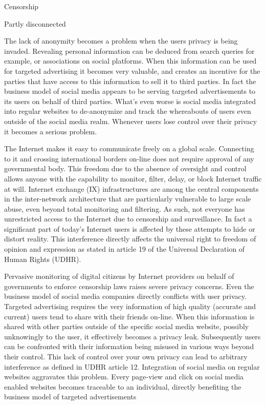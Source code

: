 
Censorship

Partly disconnected

The lack of anonymity becomes a problem when the users privacy is being invaded.
Revealing personal information can be deduced from search queries for example, or associations on social platforms.
When this information can be used for targeted advertising it becomes very valuable, and creates an incentive for the parties that have access to this information to sell it to third parties.
In fact the business model of social media appears to be serving targeted advertisements to its users on behalf of third parties.
What's even worse is social media integrated into regular websites to de-anonymize and track the whereabouts of users even outside of the social media realm.
Whenever users lose control over their privacy it becomes a serious problem.




The Internet makes it easy to communicate freely on a global scale.
Connecting to it and crossing international borders on-line does not require approval of any governmental body.
This freedom due to the absence of oversight and control allows anyone with the capability to monitor, filter, delay, or block Internet traffic at will.
Internet exchange (IX) infrastructures are among the central components in the inter-network architecture that are particularly vulnerable to large scale abuse, even beyond total monitoring and filtering.
As such, not everyone has unrestricted access to the Internet due to censorship and surveillance.
In fact a significant part of today's Internet users is affected by these attempts to hide or distort reality. %
This interference directly affects the universal right to freedom of opinion and expression as stated in article 19 of the Universal Declaration of Human Rights (UDHR).

Pervasive monitoring of digital citizens by Internet providers on behalf of governments to enforce censorship laws raises severe privacy concerns.
Even the business model of social media companies directly conflicts with user privacy.
Targeted advertising requires the very information of high quality (accurate and current) users tend to share with their friends on-line.
When this information is shared with other parties outside of the specific social media website, possibly unknowingly to the user, it effectively becomes a privacy leak.
Subsequently users can be confronted with their information being misused in various ways beyond their control.
This lack of control over your own privacy can lead to arbitrary interference as defined in UDHR article 12. %
Integration of social media on regular websites aggravates this problem.
Every page-view and click on social media enabled websites becomes traceable to an individual, directly benefiting the business model of targeted advertisements

